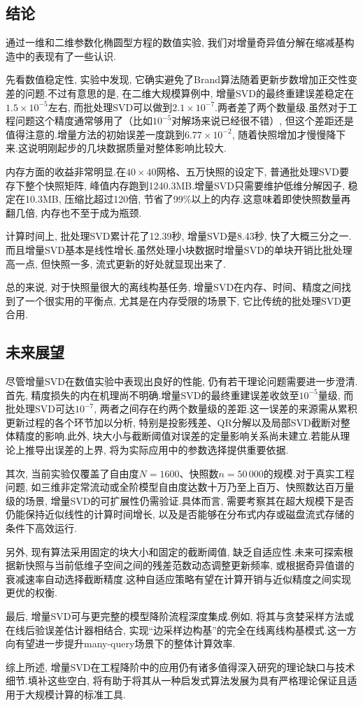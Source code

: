 \subsection{结论}

通过一维和二维参数化椭圆型方程的数值实验, 我们对增量奇异值分解在缩减基构造中的表现有了一些认识.

先看数值稳定性, 实验中发现, 它确实避免了Brand算法随着更新步数增加正交性变差的问题.不过有意思的是, 在二维大规模算例中, 增量SVD的最终重建误差稳定在$1.5\times10^{-5}$左右, 而批处理SVD可以做到$2.1\times10^{-7}$.两者差了两个数量级.虽然对于工程问题这个精度通常够用了（比如$10^{-5}$对解场来说已经很不错）, 但这个差距还是值得注意的.增量方法的初始误差一度跳到$6.77\times10^{-2}$, 随着快照增加才慢慢降下来.这说明刚起步的几块数据质量对整体影响比较大.

内存方面的收益非常明显.在$40\times40$网格、五万快照的设定下, 普通批处理SVD要存下整个快照矩阵, 峰值内存跑到1240.3MB.增量SVD只需要维护低维分解因子, 稳定在10.3MB, 压缩比超过120倍, 节省了99\%以上的内存.这意味着即使快照数量再翻几倍, 内存也不至于成为瓶颈.

计算时间上, 批处理SVD累计花了12.39秒, 增量SVD是8.43秒, 快了大概三分之一.而且增量SVD基本是线性增长.虽然处理小块数据时增量SVD的单块开销比批处理高一点, 但快照一多, 流式更新的好处就显现出来了.

总的来说, 对于快照量很大的离线构基任务, 增量SVD在内存、时间、精度之间找到了一个很实用的平衡点, 尤其是在内存受限的场景下, 它比传统的批处理SVD更合用.

\subsection{未来展望}

尽管增量SVD在数值实验中表现出良好的性能, 仍有若干理论问题需要进一步澄清.首先, 精度损失的内在机理尚不明确.增量SVD的最终重建误差收敛至$10^{-5}$量级, 而批处理SVD可达$10^{-7}$, 两者之间存在约两个数量级的差距.这一误差的来源需从累积更新过程的各个环节加以分析, 特别是投影残差、QR分解以及局部SVD截断对整体精度的影响.此外, 块大小与截断阈值对误差的定量影响关系尚未建立.若能从理论上推导出误差的上界, 将为实际应用中的参数选择提供重要依据.

其次, 当前实验仅覆盖了自由度$N=1600$、快照数$n=50\,000$的规模.对于真实工程问题, 如三维非定常流动或全阶模型自由度达数十万乃至上百万、快照数达百万量级的场景, 增量SVD的可扩展性仍需验证.具体而言, 需要考察其在超大规模下是否仍能保持近似线性的计算时间增长, 以及是否能够在分布式内存或磁盘流式存储的条件下高效运行.

另外, 现有算法采用固定的块大小和固定的截断阈值, 缺乏自适应性.未来可探索根据新快照与当前低维子空间之间的残差范数动态调整更新频率, 或根据奇异值谱的衰减速率自动选择截断精度.这种自适应策略有望在计算开销与近似精度之间实现更优的权衡.

最后, 增量SVD可与更完整的模型降阶流程深度集成.例如, 将其与贪婪采样方法或在线后验误差估计器相结合, 实现“边采样边构基”的完全在线离线构基模式.这一方向有望进一步提升many-query场景下的整体计算效率.

综上所述, 增量SVD在工程降阶中的应用仍有诸多值得深入研究的理论缺口与技术细节.填补这些空白, 将有助于将其从一种启发式算法发展为具有严格理论保证且适用于大规模计算的标准工具.